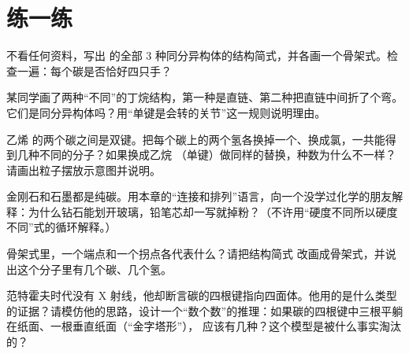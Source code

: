 \section*{练一练}

\begin{sikaoti}
\item 不看任何资料，写出  的全部 3 种同分异构体的结构简式，并各画一个骨架式。检查一遍：每个碳是否恰好四只手？
\item 某同学画了两种“不同”的丁烷结构，第一种是直链、第二种把直链中间折了个弯。它们是同分异构体吗？用“单键是会转的关节”这一规则说明理由。
\item 乙烯  的两个碳之间是双键。把每个碳上的两个氢各换掉一个、换成氯，一共能得到几种不同的分子？如果换成乙烷 （单键）做同样的替换，种数为什么不一样？请画出粒子摆放示意图并说明。
\item 金刚石和石墨都是纯碳。用本章的“连接和排列”语言，向一个没学过化学的朋友解释：为什么钻石能划开玻璃，铅笔芯却一写就掉粉？（不许用“硬度不同所以硬度不同”式的循环解释。）
\item 骨架式里，一个端点和一个拐点各代表什么？请把结构简式  改画成骨架式，并说出这个分子里有几个碳、几个氢。
\item 范特霍夫时代没有 X 射线，他却断言碳的四根键指向四面体。他用的是什么类型的证据？请模仿他的思路，设计一个“数个数”的推理：如果碳的四根键中三根平躺在纸面、一根垂直纸面（“金字塔形”）， 应该有几种？这个模型是被什么事实淘汰的？
\end{sikaoti}
